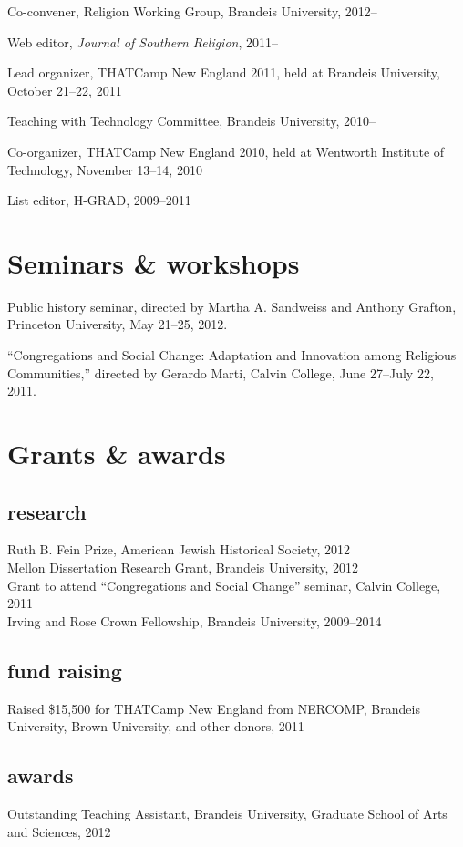 \documentclass[11pt]{article}
\begin{document}
Co-convener, Religion Working Group, Brandeis University, 
2012--

Web editor, \emph{Journal of Southern Religion}, 2011--

Lead organizer, THATCamp New England 2011, held at Brandeis University, 
October 21--22, 2011

Teaching with Technology Committee, Brandeis University, 2010--

Co-organizer, THATCamp New England 2010, held at Wentworth Institute of 
Technology, November 13--14, 2010

List editor, H-GRAD, 2009--2011

\section{Seminars \& workshops}
Public history seminar, directed by Martha A. Sandweiss and 
Anthony Grafton, Princeton University, May 21--25, 2012.

``Congregations and Social Change: Adaptation and Innovation among Religious Communities,'' directed by Gerardo Marti, Calvin College, June 27--July 22, 2011.

\section{Grants \& awards}

\subsection{research}
Ruth B. Fein Prize, American Jewish Historical Society, 2012\\
Mellon Dissertation Research Grant, Brandeis University, 2012\\
Grant to attend ``Congregations and Social Change'' seminar, Calvin 
College, 2011\\
Irving and Rose Crown Fellowship, Brandeis University, 2009--2014


\subsection{fund raising}
\noindent
Raised \$15,500 for THATCamp New England from NERCOMP, Brandeis 
University, Brown University, and other donors, 2011

\subsection{awards}
\noindent
Outstanding Teaching Assistant, Brandeis University, Graduate School of 
Arts and Sciences, 2012
\end{document}

